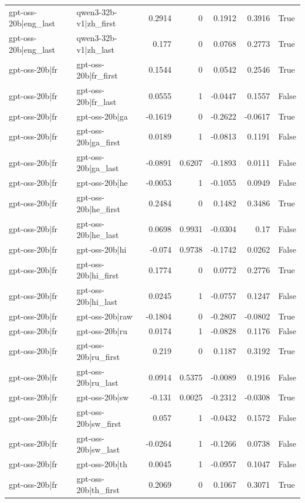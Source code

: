 \begin{table}
\begin{tabular}{l l r r r r l}
gpt-oss-20b|eng_last & qwen3-32b-v1|zh_first & 0.2914 & 0 & 0.1912 & 0.3916 & True \\
gpt-oss-20b|eng_last & qwen3-32b-v1|zh_last & 0.177 & 0 & 0.0768 & 0.2773 & True \\
gpt-oss-20b|fr & gpt-oss-20b|fr_first & 0.1544 & 0 & 0.0542 & 0.2546 & True \\
gpt-oss-20b|fr & gpt-oss-20b|fr_last & 0.0555 & 1 & -0.0447 & 0.1557 & False \\
gpt-oss-20b|fr & gpt-oss-20b|ga & -0.1619 & 0 & -0.2622 & -0.0617 & True \\
gpt-oss-20b|fr & gpt-oss-20b|ga_first & 0.0189 & 1 & -0.0813 & 0.1191 & False \\
gpt-oss-20b|fr & gpt-oss-20b|ga_last & -0.0891 & 0.6207 & -0.1893 & 0.0111 & False \\
gpt-oss-20b|fr & gpt-oss-20b|he & -0.0053 & 1 & -0.1055 & 0.0949 & False \\
gpt-oss-20b|fr & gpt-oss-20b|he_first & 0.2484 & 0 & 0.1482 & 0.3486 & True \\
gpt-oss-20b|fr & gpt-oss-20b|he_last & 0.0698 & 0.9931 & -0.0304 & 0.17 & False \\
gpt-oss-20b|fr & gpt-oss-20b|hi & -0.074 & 0.9738 & -0.1742 & 0.0262 & False \\
gpt-oss-20b|fr & gpt-oss-20b|hi_first & 0.1774 & 0 & 0.0772 & 0.2776 & True \\
gpt-oss-20b|fr & gpt-oss-20b|hi_last & 0.0245 & 1 & -0.0757 & 0.1247 & False \\
gpt-oss-20b|fr & gpt-oss-20b|raw & -0.1804 & 0 & -0.2807 & -0.0802 & True \\
gpt-oss-20b|fr & gpt-oss-20b|ru & 0.0174 & 1 & -0.0828 & 0.1176 & False \\
gpt-oss-20b|fr & gpt-oss-20b|ru_first & 0.219 & 0 & 0.1187 & 0.3192 & True \\
gpt-oss-20b|fr & gpt-oss-20b|ru_last & 0.0914 & 0.5375 & -0.0089 & 0.1916 & False \\
gpt-oss-20b|fr & gpt-oss-20b|sw & -0.131 & 0.0025 & -0.2312 & -0.0308 & True \\
gpt-oss-20b|fr & gpt-oss-20b|sw_first & 0.057 & 1 & -0.0432 & 0.1572 & False \\
gpt-oss-20b|fr & gpt-oss-20b|sw_last & -0.0264 & 1 & -0.1266 & 0.0738 & False \\
gpt-oss-20b|fr & gpt-oss-20b|th & 0.0045 & 1 & -0.0957 & 0.1047 & False \\
gpt-oss-20b|fr & gpt-oss-20b|th_first & 0.2069 & 0 & 0.1067 & 0.3071 & True \\

\end{tabular}
\end{table}
